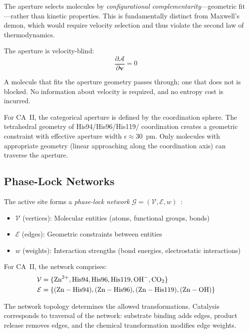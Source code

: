 \documentclass[twocolumn,amsmath,amssymb,aps,prb,superscriptaddress,longbibliography]{revtex4-2}
\newcommand{\calA}{\mathcal{A}}
\newcommand{\calG}{\mathcal{G}}
\newcommand{\calV}{\mathcal{V}}
\newcommand{\calE}{\mathcal{E}}
\begin{document}
The aperture selects molecules by \emph{configurational complementarity}---geometric fit---rather than kinetic properties. This is fundamentally distinct from Maxwell's demon, which would require velocity selection and thus violate the second law of thermodynamics.

The aperture is velocity-blind:
\begin{equation}
\frac{\partial \calA}{\partial \mathbf{v}} = 0
\label{eq:velocity-blind}
\end{equation}

A molecule that fits the aperture geometry passes through; one that does not is blocked. No information about velocity is required, and no entropy cost is incurred.

For CA~II, the categorical aperture is defined by the  coordination sphere. The tetrahedral geometry of His94/His96/His119/ coordination creates a geometric constraint with effective aperture width $\epsilon \approx 30$~pm. Only molecules with appropriate geometry (linear  approaching along the coordination axis) can traverse the aperture.

\subsection{Phase-Lock Networks}
\label{sec:phase-lock}

The active site forms a \emph{phase-lock network} $\calG = (\calV, \calE, w)$~\cite{Pikovsky2001, Strogatz2000}:
\begin{itemize}
\item $\calV$ (vertices): Molecular entities (atoms, functional groups, bonds)
\item $\calE$ (edges): Geometric constraints between entities
\item $w$ (weights): Interaction strengths (bond energies, electrostatic interactions)
\end{itemize}

For CA~II, the network comprises:
\begin{align}
\calV &= \{\ce{Zn^{2+}}, \text{His94}, \text{His96}, \text{His119}, \ce{OH-}, \ce{CO2}\} \\
\calE &= \{(\ce{Zn}-\text{His94}), (\ce{Zn}-\text{His96}), (\ce{Zn}-\text{His119}), (\ce{Zn}-\ce{OH})\}
\end{align}

The network topology determines the allowed transformations. Catalysis corresponds to traversal of the network: substrate binding adds edges, product release removes edges, and the chemical transformation modifies edge weights.
\end{document}
